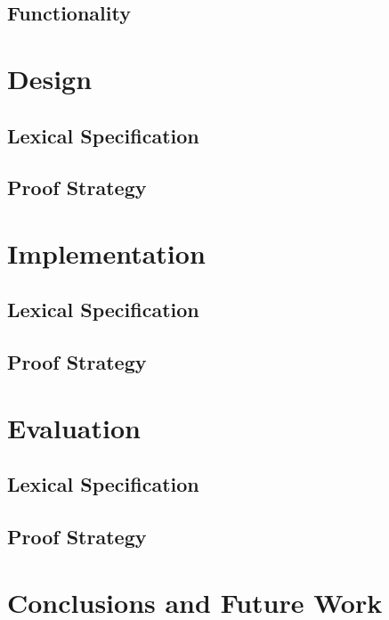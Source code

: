 \documentclass{l4proj}
\begin{document}
\section{Functionality}

\chapter{Design}

\section{Lexical Specification}

\section{Proof Strategy}

\chapter{Implementation}

\section{Lexical Specification}

\section{Proof Strategy}

\chapter{Evaluation}

\section{Lexical Specification}

\section{Proof Strategy}

\chapter{Conclusions and Future Work}
\end{document}
